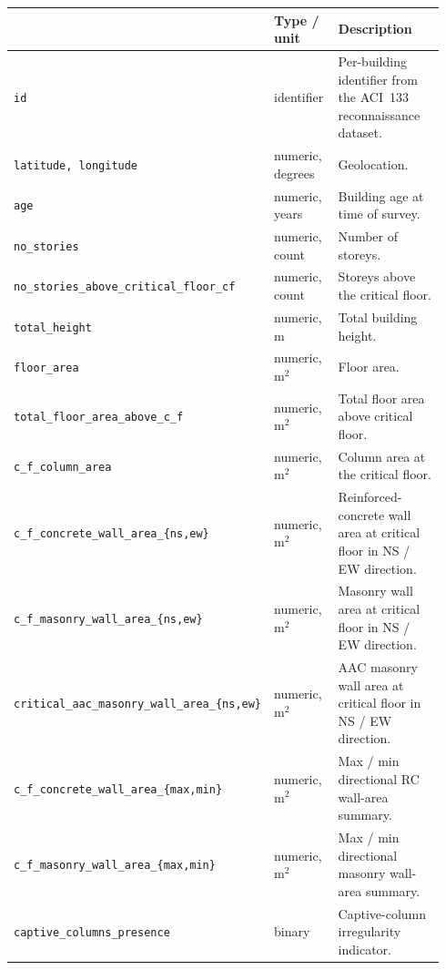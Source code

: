 \documentclass[11pt,a4paper]{article}
\begin{document}
\begin{longtable}{
>{\scriptsize\ttfamily\RaggedRight\arraybackslash}p{0.34\linewidth}
p{0.18\linewidth}
p{0.42\linewidth}
}
\toprule
{\normalsize\normalfont\bfseries Raw variable} &
\textbf{Type / unit} &
\textbf{Description} \\
\midrule
\endhead
\texttt{id}                                    & identifier              & Per-building identifier from the ACI~133 reconnaissance dataset. \\
\texttt{latitude, longitude}                   & numeric, degrees        & Geolocation. \\
\texttt{age}                                   & numeric, years          & Building age at time of survey. \\
\texttt{no\_stories}                           & numeric, count          & Number of storeys. \\
\texttt{no\_stories\_above\_critical\_floor\_cf} & numeric, count        & Storeys above the critical floor. \\
\texttt{total\_height}                         & numeric, m              & Total building height. \\
\texttt{floor\_area}                           & numeric, m$^2$          & Floor area. \\
\texttt{total\_floor\_area\_above\_c\_f}       & numeric, m$^2$          & Total floor area above critical floor. \\
\texttt{c\_f\_column\_area}                    & numeric, m$^2$          & Column area at the critical floor. \\
\texttt{c\_f\_concrete\_wall\_area\_\{ns,ew\}} & numeric, m$^2$          & Reinforced-concrete wall area at critical floor in NS / EW direction. \\
\texttt{c\_f\_masonry\_wall\_area\_\{ns,ew\}}  & numeric, m$^2$          & Masonry wall area at critical floor in NS / EW direction. \\
\texttt{critical\_aac\_masonry\_wall\_area\_\{ns,ew\}} & numeric, m$^2$  & AAC masonry wall area at critical floor in NS / EW direction. \\
\texttt{c\_f\_concrete\_wall\_area\_\{max,min\}} & numeric, m$^2$        & Max / min directional RC wall-area summary. \\
\texttt{c\_f\_masonry\_wall\_area\_\{max,min\}} & numeric, m$^2$         & Max / min directional masonry wall-area summary. \\
\texttt{captive\_columns\_presence}            & binary                  & Captive-column irregularity indicator. \\

\end{longtable}
\end{document}

